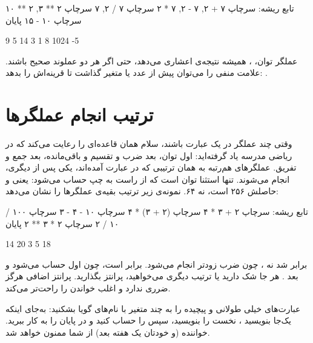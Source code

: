 \begin{salamfa}
تابع ریشه:
    سرچاپ ۷ + ۲, ۷ - ۲, ۷ * ۲
    سرچاپ ۷ / ۲, ۷ %
    سرچاپ ۲ ** ۳, ۲ ** ۱۰
    سرچاپ ۱۰ - ۱۵
پایان
\end{salamfa}

\begin{outputfa}
9 5 14
3 1
8 1024
-5
\end{outputfa}

عملگر توان، \code{**}، همیشه نتیجه‌ی
اعشاری می‌دهد، حتی اگر هر دو عملوند صحیح باشند. علامت منفی را می‌توان
پیش از عدد یا متغیر گذاشت تا قرینه‌اش را بدهد: .

\section{ترتیب انجام عملگرها}

وقتی چند عملگر در یک عبارت باشند، سلام همان قاعده‌ای را رعایت می‌کند که در
ریاضی مدرسه یاد گرفته‌اید: اول توان، بعد ضرب و تقسیم و باقی‌مانده، بعد جمع
و تفریق. عملگرهای هم‌رتبه به همان ترتیبی که در عبارت آمده‌اند، یکی پس از
دیگری، انجام می‌شوند. تنها استثنا توان است که از راست به چپ حساب می‌شود:
 یعنی  و حاصلش ۲۵۶ است، نه ۶۴.
نمونه‌ی زیر ترتیب بقیه‌ی عملگرها را نشان می‌دهد:

\begin{salamfa}
تابع ریشه:
    سرچاپ ۲ + ۳ * ۴
    سرچاپ (۲ + ۳) * ۴
    سرچاپ ۱۰ - ۴ - ۳
    سرچاپ ۱۰۰ / ۱۰ / ۲
    سرچاپ ۲ * ۳ ** ۲
پایان
\end{salamfa}

\begin{outputfa}
14
20
3
5
18
\end{outputfa}

 برابر  شد نه ، چون ضرب زودتر انجام
می‌شود.  برابر  است، چون اول  حساب
می‌شود و بعد . هر جا شک دارید یا ترتیب دیگری
می‌خواهید، پرانتز بگذارید. پرانتز اضافی هرگز ضرری ندارد و اغلب خواندن را
راحت‌تر می‌کند.

\begin{tip}
عبارت‌های خیلی طولانی و پیچیده را به چند متغیر با نام‌های گویا بشکنید:
به‌جای اینکه یک‌جا بنویسید ، نخست
 را بنویسید، سپس  را
حساب کنید و در پایان  را به کار ببرید. خواننده
(و خودتان یک هفته بعد) از شما ممنون خواهد شد.
\end{tip}

